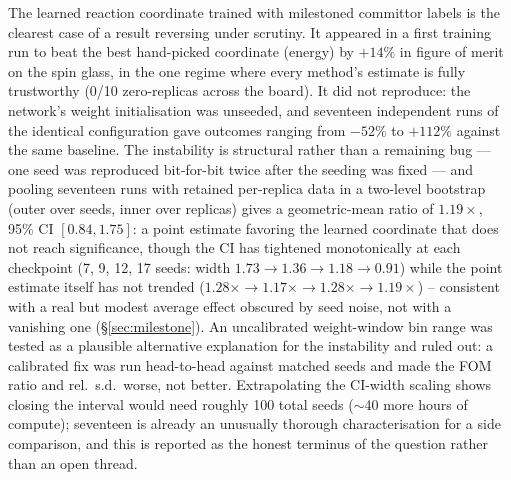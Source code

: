 \documentclass[a4paper,fleqn]{cas-sc}
\begin{document}
The learned reaction coordinate trained with milestoned committor labels is the clearest
case of a result reversing under scrutiny. It appeared in a first training run to beat the
best hand-picked coordinate (energy) by $+14\%$ in figure of merit on the spin glass, in
the one regime where every method's estimate is fully trustworthy (0/10 zero-replicas
across the board). It did not reproduce: the network's weight initialisation was
unseeded, and seventeen independent runs of the identical configuration gave outcomes
ranging from $-52\%$ to $+112\%$ against the same baseline. The instability is
structural rather than a remaining bug --- one seed was reproduced bit-for-bit twice
after the seeding was fixed --- and pooling seventeen runs with retained per-replica
data in a two-level bootstrap (outer over seeds, inner over replicas) gives a
geometric-mean ratio of $1.19\times$, 95\% CI $[0.84, 1.75]$: a point estimate favoring
the learned coordinate that does not reach significance, though the CI has tightened
monotonically at each checkpoint (7, 9, 12, 17 seeds: width
$1.73\to1.36\to1.18\to0.91$) while the point estimate itself has not trended
($1.28\times\to1.17\times\to1.28\times\to1.19\times$) -- consistent with a real but
modest average effect obscured by seed noise, not with a vanishing one
(\S\ref{sec:milestone}). An uncalibrated
weight-window bin range was tested as a plausible alternative explanation for the
instability and ruled out: a calibrated fix was run head-to-head against matched seeds
and made the FOM ratio and rel.\ s.d.\ worse, not better. Extrapolating the CI-width
scaling shows closing the interval would need roughly 100 total seeds ($\sim$40 more
hours of compute); seventeen is already an unusually thorough characterisation for a
side comparison, and this is reported as the honest terminus of the question rather
than an open thread.
\end{document}
